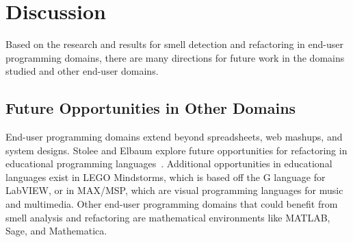 \documentclass{sig-alternate}
\begin{document}
%
%
%

\section{Discussion}
\label{sec:discussion}

Based on the research and results for smell detection and refactoring in end-user programming domains, there are many directions for future work in the domains studied and other end-user domains.

\subsection{Future Opportunities in Other Domains}
End-user programming domains extend beyond spreadsheets, web mashups, and system designs.
Stolee and Elbaum explore future opportunities for refactoring in educational programming languages~\cite{StoleeTSE2013}.
Additional opportunities in educational languages exist in LEGO Mindstorms, which is based off the G language for LabVIEW, or in MAX/MSP, which are visual programming languages for music and multimedia.
Other end-user programming domains that could benefit from smell analysis and refactoring are mathematical environments like MATLAB, Sage, and Mathematica.
\end{document}
